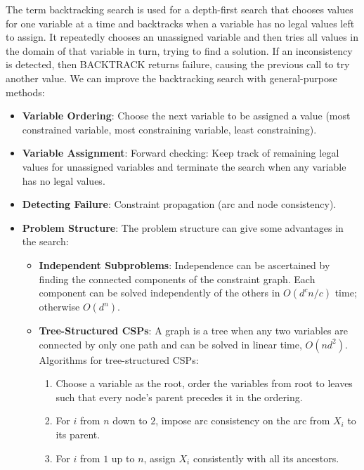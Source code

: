 \documentclass[12pt]{article}
\begin{document}
\begin{enumerate}
          The term backtracking search is used for a depth-first search that chooses values for one variable at a time and backtracks when a variable has no legal values left to assign. It repeatedly chooses an unassigned variable and then tries all values in the domain of that variable in turn, trying to find a solution. If an inconsistency is detected, then BACKTRACK returns failure, causing the previous call to try another value. We can improve the backtracking search with general-purpose methods:
          \begin{itemize}
              \item \textbf{Variable Ordering}: Choose the next variable to be assigned a value (most constrained variable, most constraining variable, least constraining).
              \item \textbf{Variable Assignment}: Forward checking: Keep track of remaining legal values for unassigned variables and terminate the search when any variable has no legal values.
              \item \textbf{Detecting Failure}: Constraint propagation (arc and node consistency).
              \item \textbf{Problem Structure}: The problem structure can give some advantages in the search:
                    \begin{itemize}
                        \item \textbf{Independent Subproblems}: Independence can be ascertained by finding the connected components of the constraint graph. Each component can be solved independently of the others in $O(d^cn/c)$ time; otherwise $O(d^n)$.
                        \item \textbf{Tree-Structured CSPs}: A graph is a tree when any two variables are connected by only one path and can be solved in linear time, $O(nd^2)$. Algorithms for tree-structured CSPs:
                              \begin{enumerate}
                                  \item Choose a variable as the root, order the variables from root to leaves such that every node's parent precedes it in the ordering.
                                  \item For $i$ from $n$ down to $2$, impose arc consistency on the arc from $X_i$ to its parent.
                                  \item For $i$ from $1$ up to $n$, assign $X_i$ consistently with all its ancestors.
                              \end{enumerate}
                    \end{itemize}
          \end{itemize}


\end{enumerate}
\end{document}
